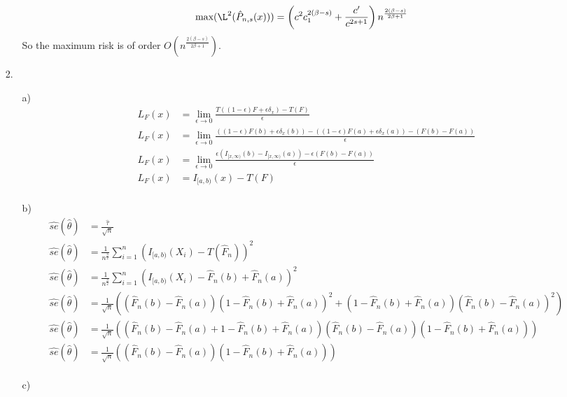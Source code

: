 \documentclass[11pt]{article}
\theoremstyle{definition}
\begin{document}
\begin{itemize}
\begin{itemize}
\begin{align*}
                    \mbox{max}(\L^2(\hat P_{n,s}(x))) &= \left(c^2c_1^{2(\beta-s)}+\frac{c'}{c^{2s+1}}\right)n^{\frac{2(\beta-s)}{2\beta+1}}
                \end{align*}
                So the maximum risk is of order \(O\left(n^{\frac{2(\beta-s)}{2\beta+1}}\right)\).
        \end{itemize}
    \item[2.]
        \begin{itemize}
            \item[a)]
                \begin{align*}
                    L_F(x)&=\lim_{\epsilon\to 0} \frac{T((1-\epsilon)F+\epsilon\delta_x)-T(F)}{\epsilon} \\
                    L_F(x)&=\lim_{\epsilon\to 0} \frac{((1-\epsilon)F(b)+\epsilon\delta_x(b))-((1-\epsilon)F(a)+\epsilon\delta_x(a))-(F(b)-F(a))}{\epsilon} \\
                    L_F(x)&=\lim_{\epsilon\to 0} \frac{\epsilon(I_{[x,\infty)}(b)-I_{[x,\infty)}(a))-\epsilon (F(b)-F(a))}{\epsilon} \\
                    L_F(x)&= I_{[a,b)}(x)-T(F) \\
                \end{align*}
            \item[b)]
                \begin{align*}
                    \hat{se}(\hat \theta) &= \frac{\hat \tau}{\sqrt{n}} \\
                    \hat{se}(\hat \theta) &= \frac{1}{n^\frac{3}{2}}\sum_{i=1}^n(I_{[a,b)}(X_i)-T(\hat F_n))^2 \\
                    \hat{se}(\hat \theta) &= \frac{1}{n^\frac{3}{2}}\sum_{i=1}^n(I_{[a,b)}(X_i)-\hat F_n(b)+\hat F_n(a))^2 \\
                    \hat{se}(\hat \theta) &= \frac{1}{\sqrt{n}}\left((\hat F_n(b)-\hat F_n(a))(1-\hat F_n(b)+\hat F_n(a))^2+(1-\hat F_n(b)+\hat F_n(a))(\hat F_n(b)-\hat F_n(a))^2\right) \\
                    \hat{se}(\hat \theta) &= \frac{1}{\sqrt{n}}\left((\hat F_n(b)-\hat F_n(a)+1- \hat F_n(b)+\hat F_n(a))(\hat F_n(b)-\hat F_n(a))(1-\hat F_n(b)+\hat F_n(a))\right) \\
                    \hat{se}(\hat \theta) &= \frac{1}{\sqrt{n}}\left((\hat F_n(b)-\hat F_n(a))(1-\hat F_n(b)+\hat F_n(a))\right) \\
                \end{align*}
            \item[c)]

\end{itemize}
\end{itemize}
\end{document}
